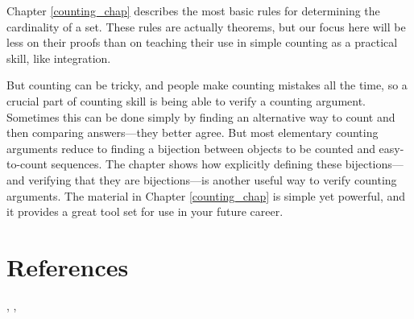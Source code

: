 \iffalse
In Chapter~\ref{chap:recurrences}, we show how to solve a variety of
recurrences that arise in computational problems.  These methods are
especially useful when you need to design or analyze recursive
programs.
\fi

Chapter \ref{counting_chap} describes the most basic rules for determining
the cardinality of a set.  These rules are actually theorems, but our
focus here will be less on their proofs than on teaching their use in
simple counting as a practical skill, like integration.

But counting can be tricky, and people make counting mistakes all the
time, so a crucial part of counting skill is being able to verify a
counting argument.  Sometimes this can be done simply by finding an
alternative way to count and then comparing answers---they better
agree.  But most elementary counting arguments reduce to finding a
bijection between objects to be counted and easy-to-count sequences.
The chapter shows how explicitly defining these bijections---and
verifying that they are bijections---is another useful way to verify
counting arguments.  The material in Chapter \ref{counting_chap} is
simple yet powerful, and it provides a great tool set for use in your
future career.


\iffalse
We conclude in Chapter~\ref{cardinality_chap} with a brief digression
into the final frontier of counting---infinity.  We'll define what it
means for a set to be countable and show you some examples of sets
that are really big---bigger even than the set of real numbers.
\fi

\section{References}
 \cite{BenjaminQ2003},
 \cite{GrahamKP1994},
 \cite{MR2359513}   %

\endinput
